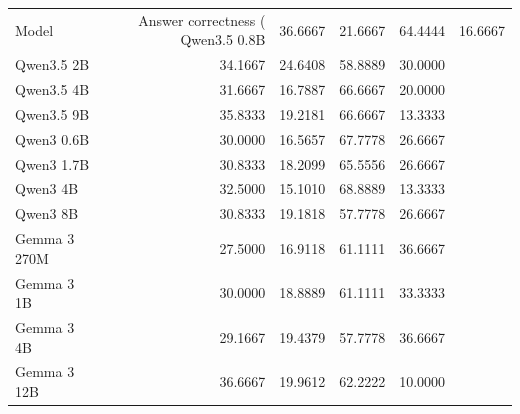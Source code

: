 \begin{tabular}{lrrrr}
\toprule
Model & Answer correctness (%
\midrule
Qwen3.5 0.8B & 36.6667 & 21.6667 & 64.4444 & 16.6667 \\
Qwen3.5 2B & 34.1667 & 24.6408 & 58.8889 & 30.0000 \\
Qwen3.5 4B & 31.6667 & 16.7887 & 66.6667 & 20.0000 \\
Qwen3.5 9B & 35.8333 & 19.2181 & 66.6667 & 13.3333 \\
Qwen3 0.6B & 30.0000 & 16.5657 & 67.7778 & 26.6667 \\
Qwen3 1.7B & 30.8333 & 18.2099 & 65.5556 & 26.6667 \\
Qwen3 4B & 32.5000 & 15.1010 & 68.8889 & 13.3333 \\
Qwen3 8B & 30.8333 & 19.1818 & 57.7778 & 26.6667 \\
Gemma 3 270M & 27.5000 & 16.9118 & 61.1111 & 36.6667 \\
Gemma 3 1B & 30.0000 & 18.8889 & 61.1111 & 33.3333 \\
Gemma 3 4B & 29.1667 & 19.4379 & 57.7778 & 36.6667 \\
Gemma 3 12B & 36.6667 & 19.9612 & 62.2222 & 10.0000 \\
\bottomrule
\end{tabular}
